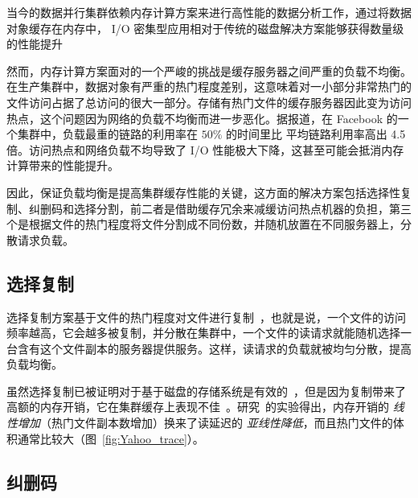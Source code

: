 \par 当今的数据并行集群依赖内存计算方案来进行高性能的数据分析工作\cite{li2014tachyon, presto, Zaharia:2016:AFG:3002856, power2010piccolo, memcached, memsql}，通过将数据对象缓存在内存中， I/O 密集型应用相对于传统的磁盘解决方案能够获得数量级的性能提升\cite{li2014tachyon, Zaharia:2016:AFG:3002856, power2010piccolo}

\par 然而，内存计算方案面对的一个严峻的挑战是缓存服务器之间严重的负载不均衡。在生产集群中，数据对象有严重的热门程度差别，这意味着对一小部分非常热门的文件访问占据了总访问的很大一部分\cite{rashmi2016ec, ananthanarayanan2011scarlett, ananthanarayanan2012pacman}。存储有热门文件的缓存服务器因此变为访问热点，这个问题因为网络的负载不均衡而进一步恶化。据报道，在 Facebook 的一个集群中，负载最重的链路的利用率在 $50\%$ 的时间里比 平均链路利用率高出 4.5 倍\cite{rashmi2016ec}。访问热点和网络负载不均导致了 I/O 性能极大下降，这甚至可能会抵消内存计算带来的性能提升。

\par 因此，保证负载均衡是提高集群缓存性能的关键，这方面的解决方案包括选择性复制\cite{ananthanarayanan2011scarlett}、纠删码\cite{rashmi2016ec}和选择分割\cite{Yu:2018:SLR:3291656.3291658}，前二者是借助缓存冗余来减缓访问热点机器的负担，第三个是根据文件的热门程度将文件分割成不同份数，并随机放置在不同服务器上，分散请求负载。

\subsection{选择复制}

\par 选择复制方案基于文件的热门程度对文件进行复制~\cite{ananthanarayanan2011scarlett,hong2013understanding}，也就是说，一个文件的访问频率越高，它会越多被复制，并分散在集群中，一个文件的读请求就能随机选择一台含有这个文件副本的服务器提供服务。这样，读请求的负载就被均匀分散，提高负载均衡。

\par 虽然选择复制已被证明对于基于磁盘的存储系统是有效的~\cite{ananthanarayanan2011scarlett}，但是因为复制带来了高额的内存开销，它在集群缓存上表现不佳~\cite{huang2014characterizing,rashmi2016ec}。研究~\cite{Yu:2018:SLR:3291656.3291658}的实验得出，内存开销的 \emph{线性增加}（热门文件副本数增加）换来了读延迟的 \emph{亚线性降低}，而且热门文件的体积通常比较大（图~\ref{fig:Yahoo_trace}）。

\subsection{纠删码}

